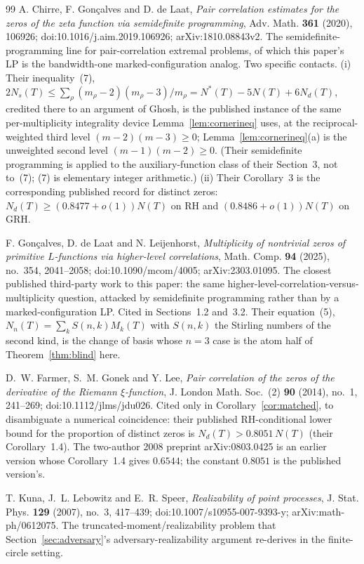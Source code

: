 \documentclass[11pt]{article}
\theoremstyle{plain}
\theoremstyle{definition}
\theoremstyle{remark}
\newcommand{\Nd}{N_{d}}
\begin{document}
\begin{thebibliography}{99}
 A. Chirre, F. Gon\c{c}alves and D. de Laat, \emph{Pair
correlation estimates for the zeros of the zeta function via semidefinite
programming}, Adv. Math. \textbf{361} (2020), 106926;
doi:10.1016/j.aim.2019.106926; arXiv:1810.08843v2. The
semidefinite-programming line for pair-correlation extremal problems, of which
this paper's LP is the bandwidth-one marked-configuration analog. Two specific
contacts. (i) Their inequality~(7),
$2 N_s(T) \le \sum_\rho (m_\rho - 2)(m_\rho - 3)/m_\rho
 = N^{*}(T) - 5N(T) + 6\Nd(T)$, credited there to an argument of Ghosh, is the
published instance of the same per-multiplicity integrality device
Lemma~\ref{lem:cornerineq} uses, at the reciprocal-weighted third level
$(m-2)(m-3) \ge 0$; Lemma~\ref{lem:cornerineq}(a) is the unweighted
second level $(m-1)(m-2) \ge 0$. (Their semidefinite programming is applied to the
auxiliary-function class of their Section~3, not to~(7); (7) is elementary integer
arithmetic.) (ii) Their Corollary~3 is the corresponding published record for
distinct zeros: $\Nd(T) \ge (0.8477 + o(1))N(T)$ on RH and
$(0.8486 + o(1))N(T)$ on GRH.

 F. Gon\c{c}alves, D. de Laat and N. Leijenhorst,
\emph{Multiplicity of nontrivial zeros of primitive $L$-functions via higher-level
correlations}, Math. Comp. \textbf{94} (2025), no.~354, 2041--2058;
doi:10.1090/mcom/4005; arXiv:2303.01095. The closest published third-party work to
this paper: the same higher-level-correlation-versus-multiplicity question,
attacked
by semidefinite programming rather than by a marked-configuration LP. Cited in
Sections~1.2 and~3.2. Their equation~(5),
$N_n(T) = \sum_k S(n,k) M_k(T)$ with $S(n,k)$ the Stirling numbers of the second
kind, is the change of basis whose $n = 3$ case is the atom half of
Theorem~\ref{thm:blind} here.

 D.~W. Farmer, S.~M. Gonek and Y. Lee, \emph{Pair correlation
of the zeros of the derivative of the Riemann $\xi$-function}, J. London Math.
Soc.~(2) \textbf{90} (2014), no.~1, 241--269; doi:10.1112/jlms/jdu026. Cited
only in
Corollary~\ref{cor:matched}, to disambiguate a numerical coincidence: their
published
RH-conditional lower bound for the proportion of distinct zeros is
$\Nd(T) > 0.8051\,N(T)$ (their Corollary~1.4). The two-author 2008 preprint
arXiv:0803.0425 is an earlier version whose Corollary~1.4 gives $0.6544$; the
constant
$0.8051$ is the published version's.

 T. Kuna, J.~L. Lebowitz and E.~R. Speer,
\emph{Realizability of point processes}, J. Stat. Phys. \textbf{129} (2007),
no.~3, 417--439; doi:10.1007/s10955-007-9393-y;
arXiv:math-ph/0612075. The truncated-moment/realizability problem that
Section~\ref{sec:adversary}'s adversary-realizability argument re-derives in the
finite-circle setting.


\end{thebibliography}
\end{document}
